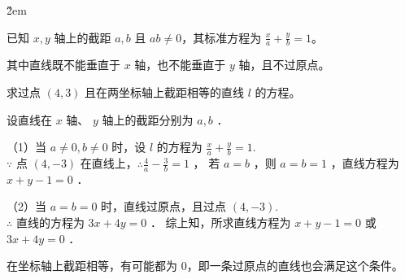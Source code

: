 \v{2em}

\begin{definition}[截距式]
    已知 $x, y$ 轴上的截距 $a, b$ 且 $ab \neq 0$，其标准方程为 $\frac{x}{a} + \frac{y}{b} = 1$。

    其中直线既不能垂直于 $x$ 轴，也不能垂直于 $y$ 轴，且不过原点。
\end{definition}

\begin{example}
    求过点 $(4,3)$ 且在两坐标轴上截距相等的直线 $l$ 的方程。
\end{example}

\begin{solution}
    设直线在 $x$ 轴、 $y$ 轴上的截距分别为 $a, b$ ．

    （1）当 $a \neq 0, b \neq 0$ 时，设 $l$ 的方程为 $\frac{x}{a}+\frac{y}{b}=1$. \\
    $\because$ 点 $(4,-3)$ 在直线上，$\therefore \frac{4}{a}-\frac{3}{b}=1$ ，
    若 $a=b$ ，则 $a=b=1$ ，直线方程为 $x+y-1=0$ ．

    （2）当 $a=b=0$ 时，直线过原点，且过点 $(4,-3)$. \\
    $\therefore$ 直线的方程为 $3 x+4 y=0$ ．
    综上知，所求直线方程为 $x+y-1=0$ 或 $3 x+4 y=0$ ．
\end{solution}

\begin{warning}
    在坐标轴上截距相等，有可能都为 $0$，即一条过原点的直线也会满足这个条件。
\end{warning}

